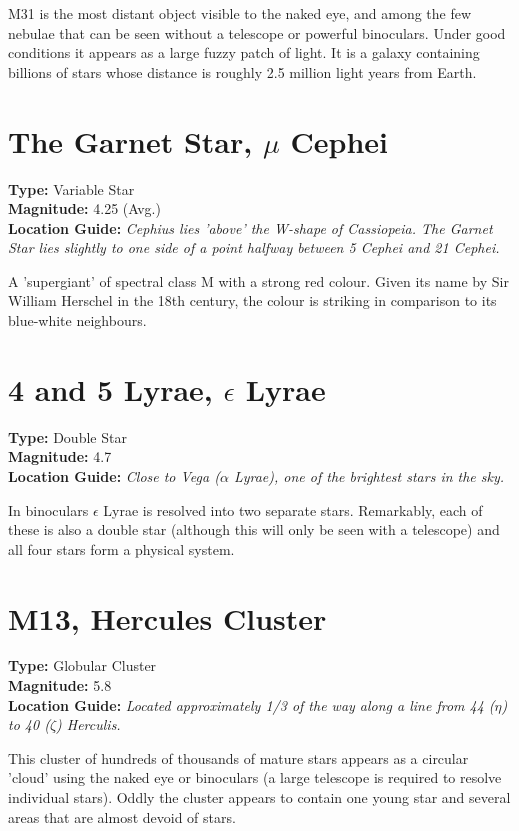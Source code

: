M31 is the most distant object visible to the naked eye, and among the
few nebulae that can be seen without a telescope or powerful
binoculars. Under good conditions it appears as a large fuzzy patch of
light. It is a galaxy containing billions of stars whose distance is
roughly 2.5 million light years from Earth.

\section{The Garnet Star, \texorpdfstring{$\mu$}{mu} Cephei}
\textbf{Type:} Variable Star \\
\textbf{Magnitude:} 4.25 (Avg.) \\
\textbf{Location Guide:} \textit{Cephius lies 'above' the W-shape of Cassiopeia. The Garnet Star lies slightly to one side of a point halfway between 5 Cephei and 21 Cephei.}

A 'supergiant' of spectral class M with a strong red colour. Given its
name by Sir William Herschel in the 18th century, the colour is
striking in comparison to its blue-white neighbours.

\section{4 and 5 Lyrae, \texorpdfstring{$\epsilon$}{epsilon} Lyrae}
\textbf{Type:} Double Star \\
\textbf{Magnitude:} 4.7 \\
\textbf{Location Guide:} \textit{Close to Vega ($\alpha$ Lyrae), one of the brightest stars in the sky.}

In binoculars $\epsilon$ Lyrae is resolved into two separate
stars. Remarkably, each of these is also a double star (although this
will only be seen with a telescope) and all four stars form a physical
system.

\section{M13, Hercules Cluster} 
\textbf{Type:} Globular Cluster \\ 
\textbf{Magnitude:} 5.8 \\
\textbf{Location Guide:} \textit{Located approximately 1/3 of the way along a line from 44 ($\eta$) to 40 ($\zeta$) Herculis.}

This cluster of hundreds of thousands of mature stars appears as
a circular 'cloud' using the naked eye or binoculars (a large
telescope is required to resolve individual stars). Oddly the cluster
appears to contain one young star and several areas that are almost
devoid of stars.


